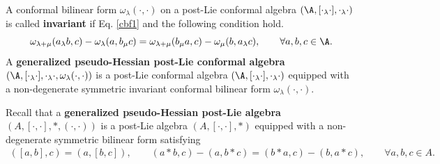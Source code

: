 \documentclass[12pt]{amsart}
\begin{document}
\begin{definition}
A conformal bilinear form
$\omega_{\lambda}(\cdot,\cdot)$ on a post-Lie conformal algebra
$(\A,[\cdot_\lambda\cdot],\cdot_\lambda\cdot)$ is called {\bf
invariant} if Eq. \eqref{cbf1} and the following condition hold.
\begin{equation}\label{cbf2}
    \omega_{\lambda+\mu} (a_\lambda b,c)-\omega_\lambda(a,b_\mu c)=\omega_{\lambda+\mu}(b_\mu a,c)-\omega_\mu(b,a_\lambda c) ,\qquad\forall a,b,c\in \A.
\end{equation}
A {\bf generalized pseudo-Hessian post-Lie conformal algebra}  $(\A,[\cdot_\lambda\cdot],\cdot_\lambda\cdot,\omega_{\lambda}(\cdot,\cdot))$   is a post-Lie  conformal algebra $(\A,[\cdot_\lambda\cdot],\cdot_\lambda\cdot)$ equipped with a non-degenerate symmetric invariant conformal bilinear form $\omega_{\lambda}(\cdot,\cdot)$.
\end{definition}
\begin{remark}
Recall \cite{LBG} that a {\bf generalized pseudo-Hessian post-Lie algebra} $(A,[\cdot,\cdot],\ast, (\cdot,\cdot))$ is a post-Lie algebra $(A,[\cdot,\cdot],\ast)$ equipped with a non-degenerate symmetric bilinear form satisfying
\begin{align*}
    ([a,b],c)=(a,[b,c]),\qquad (a\ast b,c)-(a,b\ast c)=(b\ast a,c) -(b,a\ast c),\qquad \forall a,b,c\in A.
\end{align*}
\end{remark}

\end{document}
